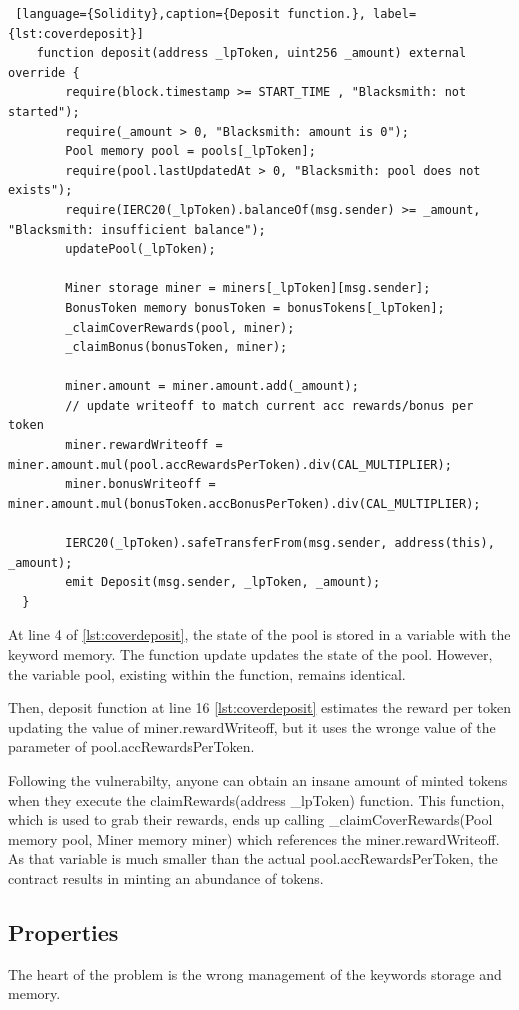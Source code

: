 \begin{lstlisting} [language={Solidity},caption={Deposit function.}, label={lst:coverdeposit}]
    function deposit(address _lpToken, uint256 _amount) external override {
        require(block.timestamp >= START_TIME , "Blacksmith: not started");
        require(_amount > 0, "Blacksmith: amount is 0");
        Pool memory pool = pools[_lpToken];
        require(pool.lastUpdatedAt > 0, "Blacksmith: pool does not exists");
        require(IERC20(_lpToken).balanceOf(msg.sender) >= _amount, "Blacksmith: insufficient balance");
        updatePool(_lpToken);

        Miner storage miner = miners[_lpToken][msg.sender];
        BonusToken memory bonusToken = bonusTokens[_lpToken];
        _claimCoverRewards(pool, miner);
        _claimBonus(bonusToken, miner);

        miner.amount = miner.amount.add(_amount);
        // update writeoff to match current acc rewards/bonus per token
        miner.rewardWriteoff = miner.amount.mul(pool.accRewardsPerToken).div(CAL_MULTIPLIER);
        miner.bonusWriteoff = miner.amount.mul(bonusToken.accBonusPerToken).div(CAL_MULTIPLIER);

        IERC20(_lpToken).safeTransferFrom(msg.sender, address(this), _amount);
        emit Deposit(msg.sender, _lpToken, _amount);
  }
\end{lstlisting}
At line 4 of \autoref{lst:coverdeposit}, the state of the pool is stored in a variable with the keyword memory. 
The function update updates the state of the pool. 
However, the variable pool, existing within the function, remains identical. 

Then, deposit function at line 16 \autoref{lst:coverdeposit} estimates the reward per token updating the value of miner.rewardWriteoff, 
but it uses the wronge value of the parameter of pool.accRewardsPerToken.

Following the vulnerabilty, anyone can obtain an insane amount of minted tokens when they execute the claimRewards(address \_lpToken) function. 
This function, which is used to grab their rewards, ends up calling \_claimCoverRewards(Pool memory pool, Miner memory miner) which references the miner.rewardWriteoff. 
As that variable is much smaller than the actual pool.accRewardsPerToken, the contract results in minting an abundance of tokens.

\subsection{Properties}
The heart of the problem is the wrong management of the keywords storage and memory. 

